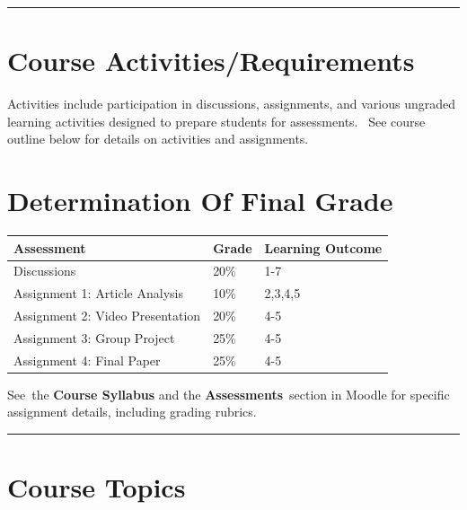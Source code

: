 \documentclass[
]{book}
\begin{document}
\begin{center}\rule{0.5\linewidth}{0.5pt}\end{center}

\hypertarget{course-activitiesrequirements}{%
\section*{Course Activities/Requirements}\label{course-activitiesrequirements}}

Activities include participation in discussions, assignments, and various ungraded learning activities designed to prepare students for assessments.~ See course outline below for details on activities and assignments.

\hypertarget{determination-of-final-grade}{%
\section*{Determination Of Final Grade}\label{determination-of-final-grade}}

\begin{longtable}[]{@{}lll@{}}
\toprule
\textbf{Assessment} & \textbf{Grade} & Learning Outcome \\
\midrule
\endhead
Discussions & 20\% & 1-7 \\
Assignment 1: Article Analysis & 10\% & 2,3,4,5 \\
Assignment 2: Video Presentation & 20\% & 4-5 \\
Assignment 3: Group Project & 25\% & 4-5 \\
Assignment 4: Final Paper & 25\% & 4-5 \\
\bottomrule
\end{longtable}

See~the \textbf{Course Syllabus} and the \textbf{Assessments}~section in Moodle for specific assignment details, including
grading rubrics.

\begin{center}\rule{0.5\linewidth}{0.5pt}\end{center}

\hypertarget{course-topics}{%
\section*{Course Topics}\label{course-topics}}
\end{document}
